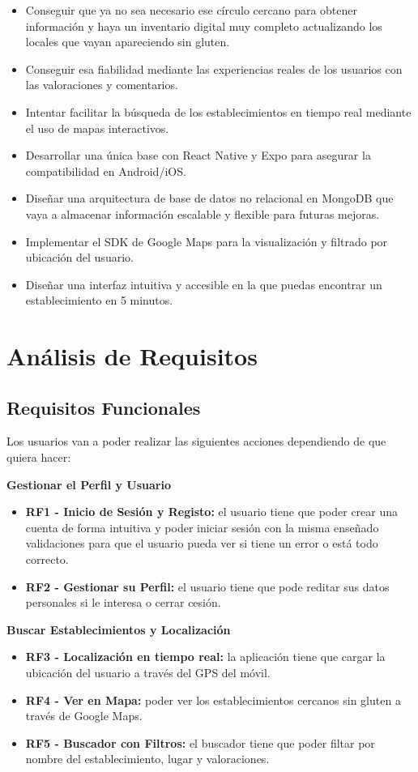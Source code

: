 \documentclass[a4paper,11pt]{article}
\begin{document}
\begin{itemize}
    \item Conseguir que ya no sea necesario ese círculo cercano para obtener información y haya un inventario digital muy completo actualizando los locales que vayan apareciendo sin gluten. 
    \item Conseguir esa fiabilidad mediante las experiencias reales de los usuarios con las valoraciones y comentarios. 
    \item Intentar facilitar la búsqueda de los establecimientos en tiempo real mediante el uso de mapas interactivos.
    \item Desarrollar una única base con React Native y Expo para asegurar la compatibilidad en Android/iOS.
    \item Diseñar una arquitectura de base de datos no relacional en MongoDB que vaya a almacenar información escalable y flexible para futuras mejoras.
    \item Implementar el SDK de Google Maps para la visualización y filtrado por ubicación del usuario.
    \item Diseñar una interfaz intuitiva y accesible en la que puedas encontrar un establecimiento en 5 minutos.
\end{itemize}

\vspace{1cm}
\section{Análisis de Requisitos}
\subsection{Requisitos Funcionales}
Los usuarios van a poder realizar las siguientes acciones dependiendo de que quiera hacer:

\textbf{Gestionar el Perfil y Usuario}
\begin{itemize}
    \item \textbf{RF1 - Inicio de Sesión y Registo:} el usuario tiene que poder crear una cuenta de forma intuitiva y poder iniciar sesión con la misma enseñado validaciones para que el usuario pueda ver si tiene un error o está todo correcto.
    \item \textbf{RF2 - Gestionar su Perfil:} el usuario tiene que pode reditar sus datos personales si le interesa o cerrar cesión.
\end{itemize}

\vspace{0.5cm}
\textbf{Buscar Establecimientos y Localización}
\begin{itemize}
    \item \textbf{RF3 - Localización en tiempo real:} la aplicación tiene que cargar la ubicación del usuario a través del GPS del móvil.
    \item \textbf{RF4 - Ver en Mapa:} poder ver los establecimientos cercanos sin gluten a través de Google Maps.
    \item \textbf{RF5 - Buscador con Filtros:} el buscador tiene que poder filtar por nombre del establecimiento, lugar y valoraciones.
\end{itemize}
\end{document}
